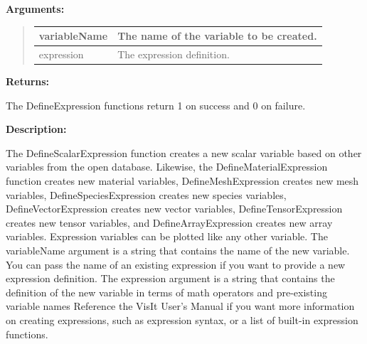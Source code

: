 \documentclass[letterpaper,10pt,english]{sphinxmanual}
\begin{document}
\begin{DUlineblock}{0em}
\item[] 
\item[] \textbf{Arguments:}
\end{DUlineblock}
\begin{quote}

\begin{tabulary}{\linewidth}{|L|L|}
\hline

variableName
 & 
The name of the variable to be created.
\\
\hline
expression
 & 
The expression definition.
\\
\hline\end{tabulary}

\end{quote}

\begin{DUlineblock}{0em}
\item[] 
\item[] \textbf{Returns:}
\item[] The DefineExpression functions return 1 on success and 0 on failure.
\item[] 
\item[] \textbf{Description:}
\item[] The DefineScalarExpression function creates a new scalar variable based on
other variables from the open database. Likewise, the
DefineMaterialExpression function creates new material variables,
DefineMeshExpression creates new mesh variables, DefineSpeciesExpression
creates new species variables, DefineVectorExpression creates new
vector variables, DefineTensorExpression creates new tensor variables, and
DefineArrayExpression creates new array variables.
Expression variables can be plotted like any other variable.
The variableName argument is a string that contains the name of the new
variable. You can pass the name of an existing expression if you want
to provide a new expression definition.
The expression argument is a string that contains the definition of the
new variable in terms of math operators and pre-existing variable names
Reference the VisIt User's Manual if you want more information on
creating expressions, such as expression syntax, or a list of built-in
expression functions.
\end{DUlineblock}

\begin{DUlineblock}{0em}
\item[] 
\end{DUlineblock}
\end{document}

